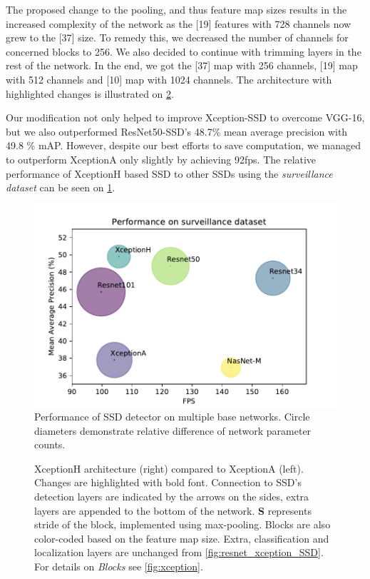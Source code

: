 The proposed change to the pooling, and thus feature map sizes results in the increased complexity of the network as the [19] features with 728 channels now grew to the [37] size. To remedy this, we decreased the number of channels for concerned blocks to 256. We also decided to continue with trimming layers in the rest of the network. In the end, we got the [37] map with 256 channels, [19] map with 512 channels and [10] map with 1024 channels. The architecture with highlighted changes is illustrated on \cref{fig:xceptionH_SSD}. 

Our modification not only helped to improve Xception-SSD to overcome VGG-16, but we also outperformed ResNet50-SSD's 48.7\% mean average precision with 49.8 \% mAP. However, despite our best efforts to save computation, we managed to outperform XceptionA only slightly by achieving 92fps. The relative performance of XceptionH based SSD to other SSDs using the \textit{surveillance dataset} can be seen on \cref{fig:surv_perf}.

\begin{figure}
    \centering
    \includegraphics[width=\textwidth]{img/fps_map_s}
    \caption[Performance of SSD with multiple base networks on Surveillance dataset]{Performance of SSD detector on multiple base networks. Circle diameters demonstrate relative difference of network parameter counts.} 
    \label{fig:surv_perf}
\end{figure}

\begin{figure}
    \centering
    \xceptionSSD
    \caption[XceptionH-SSD]%
    {XceptionH architecture (right) compared to XceptionA (left). Changes are highlighted with bold font. Connection to SSD's detection layers are indicated by the arrows on the sides, extra layers are appended to the bottom of the network.  \textbf{S} represents stride of the block, implemented using max-pooling. Blocks are also color-coded based on the feature map size. Extra, classification and localization layers are unchanged from \cref{fig:resnet_xception_SSD}. For details on \textit{Blocks} see \cref{fig:xception}.} 
    \label{fig:xceptionH_SSD}
\end{figure}




